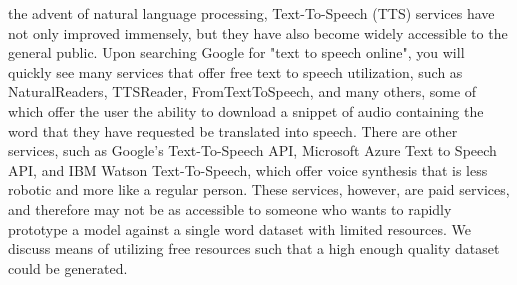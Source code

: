 \documentclass[12pt,journal,compsoc]{IEEEtran}
\begin{document}
% 
% 
% 
% 
 the advent of natural language processing, Text-To-Speech (TTS) services have not only improved immensely, but they have also become widely accessible to the general public. Upon searching Google for "text to speech online", you will quickly see many services that offer free text to speech utilization, such as NaturalReaders, TTSReader, FromTextToSpeech, and many others, some of which offer the user the ability to download a snippet of audio containing the word that they have requested be translated into speech. There are other services, such as Google's Text-To-Speech API, Microsoft Azure Text to Speech API, and IBM Watson Text-To-Speech, which offer voice synthesis that is less robotic and more like a regular person. These services, however, are paid services, and therefore may not be as accessible to someone who wants to rapidly prototype a model against a single word dataset with limited resources. We discuss means of utilizing free resources such that a high enough quality dataset could be generated. 


%
%
\end{document}

